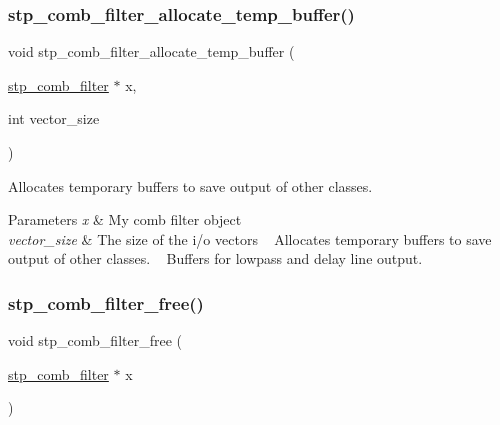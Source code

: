 \subsubsection{\texorpdfstring{stp\+\_\+comb\+\_\+filter\+\_\+allocate\+\_\+temp\+\_\+buffer()}{stp\_comb\_filter\_allocate\_temp\_buffer()}}
{\footnotesize\ttfamily void stp\+\_\+comb\+\_\+filter\+\_\+allocate\+\_\+temp\+\_\+buffer (\begin{DoxyParamCaption}\item[{\hyperlink{structstp__comb__filter}{stp\+\_\+comb\+\_\+filter} $\ast$}]{x,  }\item[{int}]{vector\+\_\+size }\end{DoxyParamCaption})\hspace{0.3cm}{\ttfamily [related]}}



Allocates temporary buffers to save output of other classes. ~\newline
 


\begin{DoxyParams}{Parameters}
{\em x} & My comb filter object ~\newline
 \\
\hline
{\em vector\+\_\+size} & The size of the i/o vectors ~\newline
 Allocates temporary buffers to save output of other classes. ~\newline
 Buffers for lowpass and delay line output. ~\newline
 \\
\hline
\end{DoxyParams}
\mbox{\label{structstp__comb__filter_af66ef0a2a2c26180060016257cf56e53}} 
\subsubsection{\texorpdfstring{stp\+\_\+comb\+\_\+filter\+\_\+free()}{stp\_comb\_filter\_free()}}
{\footnotesize\ttfamily void stp\+\_\+comb\+\_\+filter\+\_\+free (\begin{DoxyParamCaption}\item[{\hyperlink{structstp__comb__filter}{stp\+\_\+comb\+\_\+filter} $\ast$}]{x }\end{DoxyParamCaption})\hspace{0.3cm}{\ttfamily [related]}}



